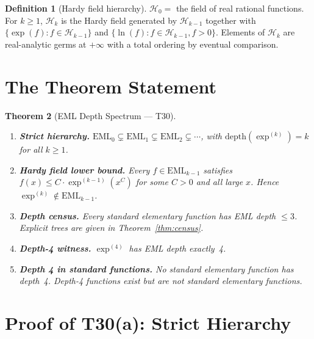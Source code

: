 \documentclass[12pt,a4paper]{article}
\newtheorem{theorem}{Theorem}[section]
\theoremstyle{definition}
\newtheorem{definition}[theorem]{Definition}
\theoremstyle{remark}
\begin{document}
\begin{definition}[Hardy field hierarchy]\label{def:hardy}
$\mathcal{H}_0 = $ the field of real rational functions.  For $k \geq 1$,
$\mathcal{H}_k$ is the Hardy field generated by $\mathcal{H}_{k-1}$ together
with $\{\exp(f) : f \in \mathcal{H}_{k-1}\}$ and $\{\ln(f) : f \in \mathcal{H}_{k-1},
f > 0\}$.  Elements of $\mathcal{H}_k$ are real-analytic germs at $+\infty$
with a total ordering by eventual comparison.
\end{definition}

\section{The Theorem Statement}

\begin{theorem}[EML Depth Spectrum --- T30]\label{thm:T30}
\mbox{}
\begin{enumerate}
  \item[\textbf{(a)}] \textbf{Strict hierarchy.}
        $\mathrm{EML}_0 \subsetneq \mathrm{EML}_1 \subsetneq \mathrm{EML}_2
        \subsetneq \cdots$, with $\mathrm{depth}(\exp^{(k)}) = k$ for all $k \geq 1$.

  \item[\textbf{(b)}] \textbf{Hardy field lower bound.}
        Every $f \in \mathrm{EML}_{k-1}$ satisfies
        $f(x) \leq C \cdot \exp^{(k-1)}(x^C)$ for some $C > 0$ and all large $x$.
        Hence $\exp^{(k)} \notin \mathrm{EML}_{k-1}$.

  \item[\textbf{(c)}] \textbf{Depth census.}
        Every standard elementary function has EML depth $\leq 3$.
        Explicit trees are given in Theorem~\ref{thm:census}.

  \item[\textbf{(d)}] \textbf{Depth-4 witness.}
        $\exp^{(4)}$ has EML depth exactly~4.

  \item[\textbf{(e)}] \textbf{Depth 4 in standard functions.}
        No standard elementary function has depth~4.
        Depth-4 functions exist but are not standard elementary functions.
\end{enumerate}
\end{theorem}

\section{Proof of T30(a): Strict Hierarchy}
\end{document}
